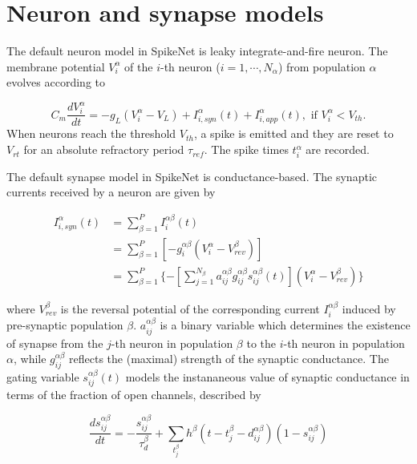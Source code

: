 \documentclass{article}
\begin{document}
\section{Neuron and synapse models}
\label{sec:model}



The default neuron model in SpikeNet is leaky integrate-and-fire neuron. 
The membrane potential $V^{\alpha}_{i}$ of the $i$-th neuron ($i=1,\cdots,N_{\alpha}$) from population $\alpha$ evolves according to

\begin{equation}
C_{m}\frac{dV^{\alpha}_{i}}{dt} = -g_{L}(V^{\alpha}_{i}-V_{L}) + I^{\alpha}_{i,syn}(t) + I^{\alpha}_{i,app}(t), \text{ if } V^{\alpha}_{i} < V_{th}.
\end{equation}
When neurons reach the threshold $V_{th}$, a spike is emitted and they are reset to $V_{rt}$ for an absolute refractory period $\tau_{ref}$. 
The spike times $t^{\alpha}_{i}$ are recorded.

The default synapse model in SpikeNet is conductance-based. 
The synaptic currents received by a neuron are given by

\begin{align}
I^{\alpha}_{i,syn}(t) &= \sum_{\beta=1}^{P}I^{\alpha\beta}_{i}(t) \\
 &= \sum_{\beta=1}^{P}[-g_{i}^{\alpha\beta}(V^{\alpha}_{i}-V_{rev}^{\beta})] \\
 &= \sum_{\beta=1}^{P}\{-[\sum_{j=1}^{N_{\beta}}a_{ij}^{\alpha\beta}g_{ij}^{\alpha\beta}s_{ij}^{\alpha\beta}(t)](V^{\alpha}_{i}-V_{rev}^{\beta})\}\label{eq:I_syn}
\end{align}


\noindent
where $V_{rev}^{\beta}$ is the reversal potential of the corresponding current $I^{\alpha\beta}_{i}$ induced by pre-synaptic population $\beta$. 
$a_{ij}^{\alpha\beta}$ is a binary variable which determines the existence of synapse from the $j$-th neuron in population $\beta$ to the $i$-th neuron in  population $\alpha$, while $g_{ij}^{\alpha\beta}$ reflects the (maximal) strength of the synaptic conductance. 
The gating variable $s_{ij}^{\alpha\beta}(t)$ models the instananeous value of synaptic conductance in terms of the fraction of open channels, described by

\begin{equation}
\frac{ds_{ij}^{\alpha\beta}}{dt} = -\frac{s_{ij}^{\alpha\beta}}{\tau_{d}^{\beta}}+\sum_{t^{\beta}_{j}}h^{\beta}(t-t^{\beta}_{j}-d^{\alpha\beta}_{ij})(1-s_{ij}^{\alpha\beta})
\label{eq:gating}
\end{equation}
\end{document}
